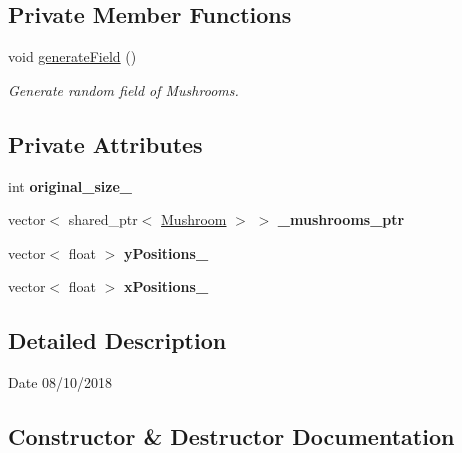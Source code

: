 \subsection*{Private Member Functions}
\begin{DoxyCompactItemize}
\item 
\mbox{\label{class_mushroom_field_a18609a3ce909bc03f9d5b04a166e80ab}} 
void \mbox{\hyperlink{class_mushroom_field_a18609a3ce909bc03f9d5b04a166e80ab}{generate\+Field}} ()
\begin{DoxyCompactList}\small\item\em Generate random field of Mushrooms. \end{DoxyCompactList}\end{DoxyCompactItemize}
\subsection*{Private Attributes}
\begin{DoxyCompactItemize}
\item 
\mbox{\label{class_mushroom_field_a8fc5cfef80a4e3e738179f6314603d8d}} 
int {\bfseries original\+\_\+size\+\_\+}
\item 
\mbox{\label{class_mushroom_field_a15e1b4da78b48430eb6e59003af6446e}} 
vector$<$ shared\+\_\+ptr$<$ \mbox{\hyperlink{class_mushroom}{Mushroom}} $>$ $>$ {\bfseries \+\_\+mushrooms\+\_\+ptr}
\item 
\mbox{\label{class_mushroom_field_ae5604bf107ab35250250148c6a5cb378}} 
vector$<$ float $>$ {\bfseries y\+Positions\+\_\+}
\item 
\mbox{\label{class_mushroom_field_a6997a1424b8217d589bca4e605ce5c6a}} 
vector$<$ float $>$ {\bfseries x\+Positions\+\_\+}
\end{DoxyCompactItemize}


\subsection{Detailed Description}
\begin{DoxyDate}{Date}
08/10/2018 
\end{DoxyDate}


\subsection{Constructor \& Destructor Documentation}
\mbox{\label{class_mushroom_field_af2fe64e9f63e8fcec6a5bbae644de4cb}} 
